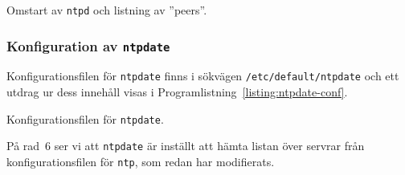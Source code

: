 \begin{listing}[H]
\caption{Omstart av \texttt{ntpd} och listning av ''peers''.}
\label{listing:ntp-reload-list}
\end{listing}


\subsubsection{Konfiguration av \texttt{ntpdate}}
Konfigurationsfilen för \texttt{ntpdate} finns i sökvägen \texttt{/etc/default/ntpdate}
och ett utdrag ur dess innehåll visas i Programlistning~\ref{listing:ntpdate-conf}.

\begin{listing}[H]
\caption{Konfigurationsfilen för \texttt{ntpdate}.}
\label{listing:ntpdate-conf}
\end{listing}

På rad~6 ser vi att \texttt{ntpdate} är inställt att hämta listan över
servrar från konfigurationsfilen för \texttt{ntp}, som redan har modifierats.
